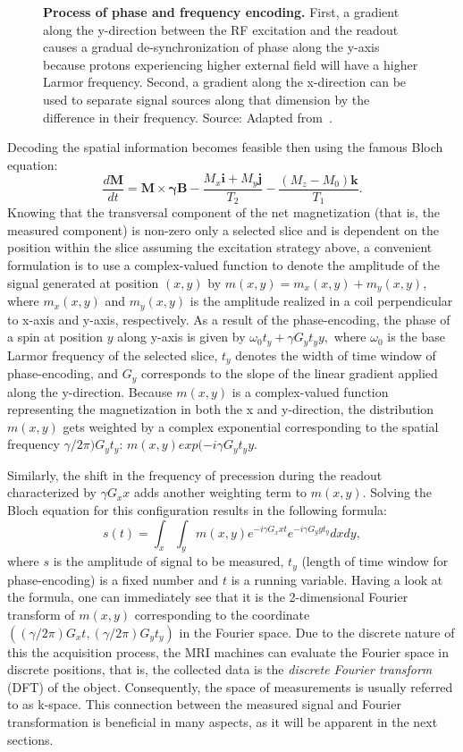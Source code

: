 \begin{figure}[thb]
\begin{minipage}{0.53\textwidth}
        \caption{\textbf{Process of phase and frequency encoding.} First, a gradient along the y-direction between the RF excitation and the readout causes a gradual de-synchronization of phase along the y-axis because protons experiencing higher external field will have a higher Larmor frequency. Second, a gradient along the x-direction can be used to separate signal sources along that dimension by the difference in their frequency. Source: Adapted from~\cite{ridgway_cardiovascular_2010}.}
        \label{fig:phase_and_freq_encoding}
    \end{minipage}
\end{figure}

Decoding the spatial information becomes feasible then using the famous Bloch equation:
\[\frac{d\mathbf{M}}{dt} = \mathbf{M} \times \boldsymbol{\gamma} \mathbf{B} - \frac{M_x\mathbf{i} + M_y\mathbf{j}}{T_2} - \frac{(M_z - M_0)\mathbf{k}}{T_1}.\]
Knowing that the transversal component of the net magnetization (that is, the measured component) is non-zero only a selected slice and is dependent on the position within the slice assuming the excitation strategy above, a convenient formulation is to use a complex-valued function to denote the amplitude of the signal generated at position $(x,y)$ by $m(x,y) = m_x(x,y) + m_y(x,y)$, where $m_x(x,y)$ and $m_y(x,y)$ is the amplitude realized in a coil perpendicular to x-axis and y-axis, respectively. As a result of the phase-encoding, the phase of a spin at position $y$ along y-axis is given by $\omega_0 t_y + \gamma G_y t_y y,$ where $\omega_0$ is the base Larmor frequency of the selected slice, $t_y$ denotes the width of time window of phase-encoding, and $G_y$ corresponds to the slope of the linear gradient applied along the y-direction. Because $m(x,y)$ is a complex-valued function representing the magnetization in both the x and y-direction, the distribution $m(x,y)$ gets weighted by a complex exponential corresponding to the spatial frequency $\gamma/2\pi)G_y t_y$: $m(x,y)exp(-i\gamma G_y t_y y$. 

Similarly, the shift in the frequency of precession during the readout characterized by $\gamma G_x x$ adds another weighting term to $m(x,y)$. Solving the Bloch equation for this configuration results in the following formula:
\[s(t) = \int_x \int_y m(x,y) e^{-i\gamma G_x x t} e^{-i\gamma G_y y t_y} dx dy,\]
where $s$ is the amplitude of signal to be measured, $t_y$ (length of time window for phase-encoding) is a fixed number and $t$ is a running variable. Having a look at the formula, one can immediately see that it is the 2-dimensional Fourier transform of $m(x,y)$ corresponding to the coordinate $((\gamma/2\pi)G_x t, (\gamma/2\pi)G_y t_y)$ in the Fourier space. Due to the discrete nature of this the acquisition process, the MRI machines can evaluate the Fourier space in discrete positions, that is, the collected data is the \textit{discrete Fourier transform} (DFT) of the object. Consequently, the space of measurements is usually referred to as k-space. This connection between the measured signal and Fourier transformation is beneficial in many aspects, as it will be apparent in the next sections.


